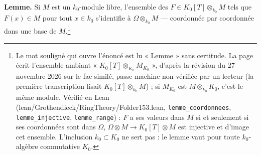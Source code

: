 \documentclass[11pt,a4paper]{article}
\begin{document}
\textbf{Lemme.} Si $M$ est un $k_{0}$-module libre, l'ensemble des
$F \in K_{0}[T] \otimes_{k_{0}} M$ tels que $F(x) \in M$ pour tout $x \in k_{0}$
s'identifie à $\Omega \otimes_{k_{0}} M$ --- coordonnée par coordonnée dans une
base de $M$.\footnote{Le mot souligné qui ouvre l'énoncé est lu « Lemme »
sans certitude. La page écrit l'ensemble ambiant « $K_{0}[T] \otimes_{K_{0}}
M_{K_{0}}$ », d'après la révision du 27 novembre 2026 sur le fac-similé, passe
machine non vérifiée par un lecteur (la première transcription lisait
$K_{0}[T] \otimes_{k_{0}} M$) ; si $M_{K_{0}}$ est $M \otimes_{k_{0}} K_{0}$,
c'est le même module. Vérifié en Lean (lean/Grothendieck/RingTheory/Folder153.lean,
\texttt{lemme\_coordonnees}, \texttt{lemme\_injective},
\texttt{lemme\_range}) : $F$ a ses valeurs dans $M$ si et seulement si ses
coordonnées sont dans $\Omega$, $\Omega \otimes M \to K_0[T] \otimes M$ est
injective et d'image cet ensemble. L'inclusion $k_0 \subset K_0$ ne sert
pas : le lemme vaut pour toute $k_0$-algèbre commutative $K_0$.}
\end{document}
